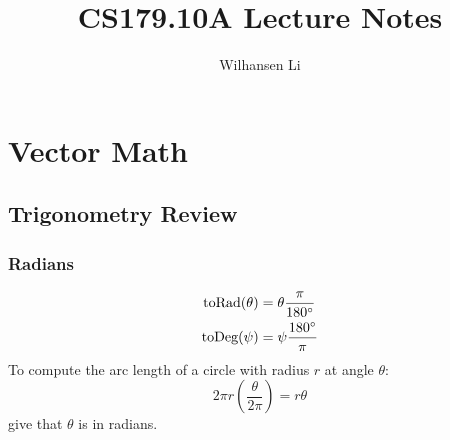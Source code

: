 \documentclass[12pt]{report}
\title{CS179.10A Lecture Notes}
\author{Wilhansen Li}
\begin{document}
\maketitle
\tableofcontents

\chapter{Vector Math}
\section{Trigonometry Review}
\subsection{Radians}
\begin{align*}
\text{toRad}(\theta) &= \theta \frac{\pi}{180\degree} \\
\text{toDeg}(\psi) &= \psi\frac{180\degree}{\pi}
\end{align*}
To compute the arc length of a circle with radius $r$ at angle $\theta$:
$$
2\pi r \left(\frac{\theta}{2\pi}\right) = r\theta
$$
give that $\theta$ is in radians.
\end{document}
